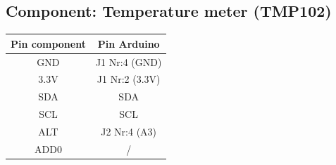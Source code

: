 \documentclass[a4paper]{report}
\begin{document}
        \subsection{Component: Temperature meter (TMP102)}
            \begin{tabular}{|c|c|}
                \hline
                Pin component & Pin Arduino\\
                \hline
                GND  & J1 Nr:4  (GND)\\
                3.3V & J1 Nr:2  (3.3V)\\
                SDA  & SDA\\
                SCL  & SCL\\
                ALT  & J2 Nr:4  (A3)\\
                ADD0 & /\\
                \hline
            \end{tabular}
            
\end{document}
